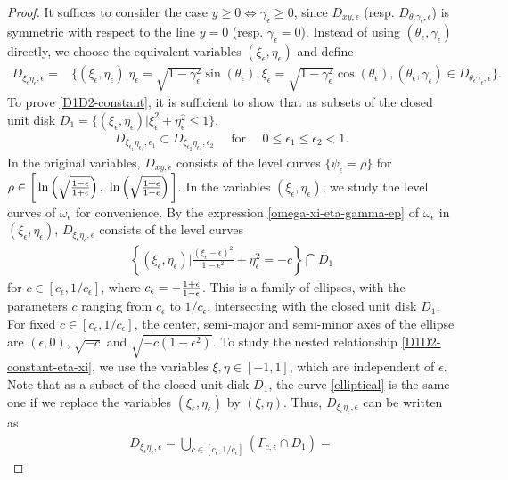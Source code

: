 \documentclass[1 [leqno, 11pt]{amsart}
\numberwithin{equation}{section}
\let\ep=\epsilon
\begin{document}
\begin{CJK*}{GBK}{song}
\begin{proof} It suffices to consider the case $y\geq0\Longleftrightarrow\gamma_\ep\geq0$, since $D_{xy,\ep}$ (resp. $D_{\theta_\ep\gamma_\ep,\ep}$) is symmetric with respect to the line $y=0$ (resp. $\gamma_\ep=0$). Instead of using  $(\theta_\ep,\gamma_{\ep})$ directly, we choose the equivalent variables $(\xi_\ep,\eta_\ep)$ and define
\begin{align*}
D_{\xi_\ep\eta_\ep,\ep}=&\{(\xi_\ep,\eta_\ep)|
\eta_\ep = \sqrt{1-\gamma_\ep^2} \sin(\theta_\ep),
\xi_\ep = \sqrt{1-\gamma_\ep^2} \cos(\theta_\ep),
(\theta_\ep,\gamma_{\ep})\in D_{\theta_\ep\gamma_\ep,\ep}\}.
\end{align*}
To prove \eqref{D1D2-constant}, it is sufficient to show that as subsets of the closed unit disk $D_1=\{(\xi_{\ep},\eta_{\ep})|\xi_{\ep}^2+\eta_{\ep}^2\leq1\}$,
\begin{align}\label{D1D2-constant-eta-xi}
D_{\xi_{\ep_1}\eta_{\ep_1},\ep_1}\subset D_{\xi_{\ep_2}\eta_{\ep_2},\ep_2}\quad\text{ for }\quad0\leq \ep_1\leq \ep_2<1.
\end{align}
In the original variables, $D_{xy,\ep}$ consists of the level curves $\{\psi_\ep=\rho\}$ for $\rho\in\bigg[\ln\left(\sqrt{1-\ep\over 1+\ep}\right),$ $\ln\left(\sqrt{1+\ep\over 1-\ep}\right)\bigg]$. In the variables $(\xi_\ep,\eta_\ep)$, we study the level curves of $\omega_\ep$ for convenience. By the expression  \eqref{omega-xi-eta-gamma-ep} of $\omega_\ep$ in $(\xi_\ep,\eta_\ep)$, $D_{\xi_\ep\eta_\ep,\ep}$ consists of the level curves
\begin{align}\label{elliptical}
\left\{(\xi_\ep,\eta_\ep)\bigg|\frac{(\xi_\ep - \ep)^2}{1-\ep^2} + \eta_\ep^2=-c\right\}\bigcap D_1
\end{align}
for $c\in\left[c_\ep,1/c_\ep\right]$, where $c_\ep=-{1+\ep\over 1-\ep}$.
This is a family of ellipses, with the parameters $c$ ranging from $c_\ep$ to $1/c_\ep$, intersecting with the closed unit disk $D_1$. For fixed $c\in\left[c_\ep,1/c_\ep\right]$, the center, semi-major and semi-minor axes of the ellipse are $(\ep,0)$,  $\sqrt{-c}$ and $\sqrt{-c(1-\ep^2)}$. To study the nested relationship \eqref{D1D2-constant-eta-xi}, we use the variables $\xi,\eta\in[-1,1]$, which are independent of $\ep$. Note that as a subset of the closed unit disk $D_1$,
 the curve \eqref{elliptical} is the same one if we replace the variables $(\xi_\ep,\eta_\ep)$ by $(\xi,\eta)$. Thus, $D_{\xi_\ep\eta_\ep,\ep}$ can be written as
\begin{align*}
D_{\xi_\ep\eta_\ep,\ep}=\bigcup_{c\in\left[c_\ep,1/c_\ep\right]} \left(\Gamma_{c,\ep}\cap D_1\right)=

\end{align*}
\end{proof}
\end{CJK*}
\end{document}
